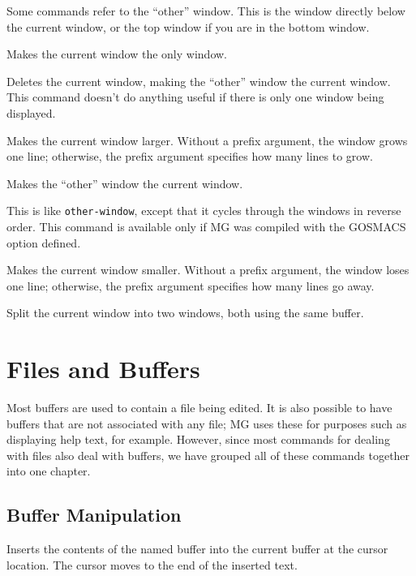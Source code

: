 Some commands refer to the ``other'' window.  This is the window directly
below the current window, or the top window if you are in the bottom window.

\fbody Makes the current window the only window.

\fbody Deletes the current window, making the ``other'' window the
current window.  This command doesn't do anything useful if there is only
one window being displayed.

\fbody Makes the current window larger.  Without a prefix argument, the
window grows one line; otherwise, the prefix argument specifies how many
lines to grow.

\fbody Makes the ``other'' window the current window.

\fbody This is like {\tt other-window}, except that it cycles through
the windows in reverse order.  This command is available only if MG was
compiled with the GOSMACS option defined.

\fbody Makes the current window smaller.  Without a prefix argument, the
window loses one line; otherwise, the prefix argument specifies how many
lines go away.

\fbody Split the current window into two windows, both using the same
buffer.


\chapter{Files and Buffers}

Most buffers are used to contain a file being edited.  It is
also possible to have buffers that are not associated with any file;
MG uses these for purposes such as displaying help text, for example.
However, since most commands for dealing with files also deal with
buffers, we have grouped all of these commands together into one chapter.

\section{Buffer Manipulation}

\fbody Inserts the contents of the named buffer into the current buffer
at the cursor location.  The cursor moves to the end of the inserted
text.

